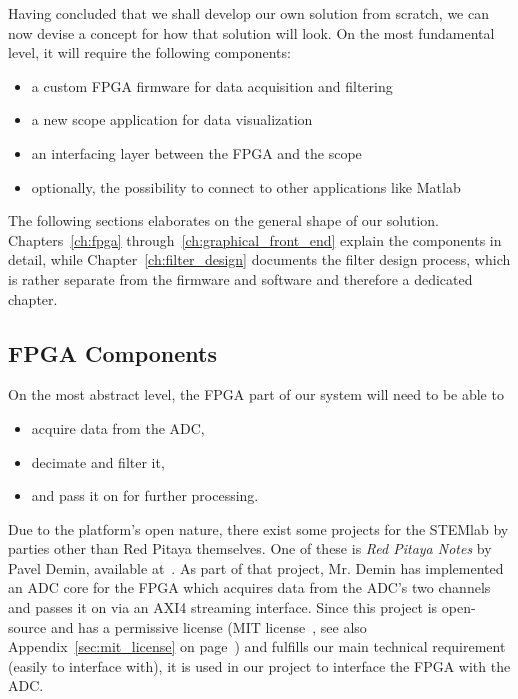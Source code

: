 Having concluded that  we shall develop our own solution  from scratch, we can
now devise a concept for how that solution will look.  On the most fundamental
level, it will require the following components:
\begin{itemize}
    \item
        a custom FPGA firmware for data acquisition and filtering
    \item
        a new scope application for data visualization
    \item
        an interfacing layer between the FPGA and the scope
    \item
        optionally, the possibility to connect to other applications like Matlab
\end{itemize}
The   following   sections   elaborates   on  the   general   shape   of   our
solution. Chapters~\ref{ch:fpga}  through~\ref{ch:graphical_front_end} explain
the components  in detail, while Chapter~\ref{ch:filter_design}  documents the
filter design process, which is rather separate from the firmware and software
and therefore a dedicated chapter.

%
%
\subsection{FPGA Components} %
\label{subsec:concept:fpga_components}

On the most abstract level, the FPGA part of our system will need to be able to
\begin{itemize}\tightlist
    \item
        acquire data from the ADC,
    \item
        decimate and filter it,
    \item
        and pass it on for further processing.
\end{itemize}

Due to the  platform's open nature, there exist some  projects for the STEMlab
by parties other than Red Pitaya  themselves. One of these is \emph{Red Pitaya
Notes} by  Pavel Demin, available  at~\cite{pita:github:pitaya-notes}. As part
of that  project, Mr. Demin  has implemented  an ADC core  for the  FPGA which
acquires  data from  the ADC's  two  channels and  passes  it on  via an  AXI4
streaming interface\footnotemark.
Since  this  project  is  open-source   and  has  a  permissive  license  (MIT
license~\cite{licenses:mit},   see   also  Appendix~\ref{sec:mit_license}   on
page~\pageref{sec:mit_license})  and fulfills  our main  technical requirement
(easily to interface  with), it is used  in our project to  interface the FPGA
with the ADC.

